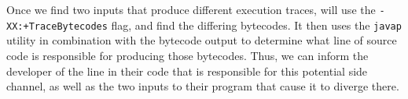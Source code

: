 Once we find two inputs that produce different execution traces, \jcupid will
use the \texttt{-XX:+TraceBytecodes} flag, and find the differing bytecodes. It
then uses the \texttt{javap} utility in combination with the bytecode output to
determine what line of source code is responsible for producing those bytecodes.
Thus, we can inform the developer of the line in their code that is responsible
for this potential side channel, as well as the two inputs to their program that
cause it to diverge there.


%

%

